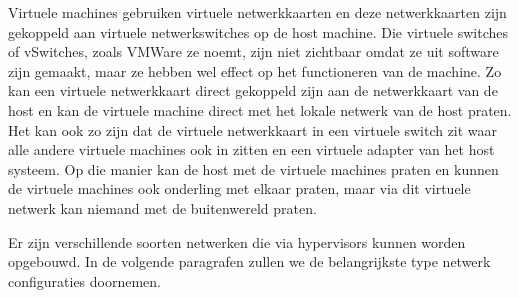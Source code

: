 Virtuele machines gebruiken virtuele netwerkkaarten en deze netwerkkaarten zijn gekoppeld aan virtuele netwerkswitches op de host machine. Die virtuele switches of vSwitches, zoals VMWare ze noemt, zijn niet zichtbaar omdat ze uit software zijn gemaakt, maar ze hebben wel effect op het functioneren van de machine. Zo kan een virtuele netwerkkaart direct gekoppeld zijn aan de netwerkkaart van de host en kan de virtuele machine direct met het lokale netwerk van de host praten. Het kan ook zo zijn dat de virtuele netwerkkaart in een virtuele switch zit waar alle andere virtuele machines ook in zitten en een virtuele adapter van het host systeem. Op die manier kan de host met de virtuele machines praten en kunnen de virtuele machines ook onderling met elkaar praten, maar via dit virtuele netwerk kan niemand met de buitenwereld praten.

Er zijn verschillende soorten netwerken die via hypervisors kunnen worden opgebouwd. In de volgende paragrafen zullen we de belangrijkste type netwerk configuraties doornemen.
